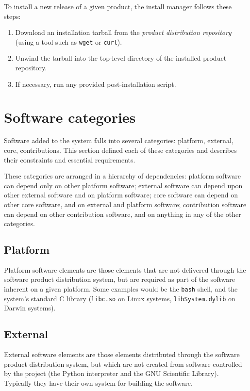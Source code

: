 \documentclass[draftmode,draftwater]{memarticle}
\newcommand{\prog}[1]%
  {\texttt{#1}}
\begin{document}
To install a new release of a given product, the install manager follows
these steps:
\begin{enumerate}
\item Download an installation tarball from the \emph{product distribution
  repository} (using a tool such as \prog{wget} or \prog{curl}).
\item Unwind the tarball into the top-level directory of the installed
  product repository.
\item If necessary, run any provided post-installation script.
\end{enumerate}

\section{Software categories}

Software added to the system falls into several categories: platform,
external, core, contributions. This section defined each of these
categories and describes their constraints and essential requirements.

These categories are arranged in a hierarchy of dependencies: platform
software can depend only on other platform software; external software
can depend upon other external software and on platform software; core
software can depend on other core software, and on external and platform
software; contribution software can depend on other contribution
software, and on anything in any of the other categories.

\subsection{Platform}

Platform software elements are those elements that are not delivered
through the software product distribution system, but are required as
part of the software inherent on a given platform. Some examples would
be the \prog{bash} shell, and the system's standard C library
(\prog{libc.so} on Linux systems, \prog{libSystem.dylib} on Darwin
systems).

\subsection{External}

External software elements are those elements distributed through the
software product distribution system, but which are not created from
software controlled by the project (\eg the Python interpreter and the
GNU Scientific Library). Typically they have their own system for
building the software.
\end{document}
